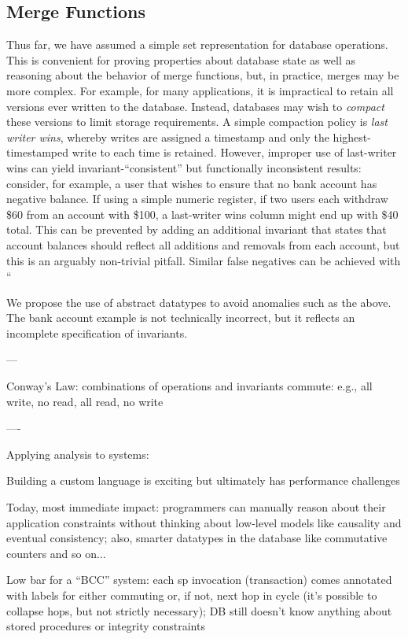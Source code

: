 \subsection{Merge Functions}

Thus far, we have assumed a simple set representation for database
operations. This is convenient for proving properties about database
state as well as reasoning about the behavior of merge functions, but,
in practice, merges may be more complex. For example, for many
applications, it is impractical to retain all versions ever written to
the database. Instead, databases may wish to \textit{compact} these
versions to limit storage requirements. A simple compaction policy is
\textit{last writer wins}, whereby writes are assigned a timestamp and
only the highest-timestamped write to each time is retained. However,
improper use of last-writer wins can yield invariant-``consistent''
but functionally inconsistent results: consider, for example, a user
that wishes to ensure that no bank account has negative balance. If
using a simple numeric register, if two users each withdraw \$60 from
an account with \$100, a last-writer wins column might end up with
\$40 total. This can be prevented by adding an additional invariant
that states that account balances should reflect all additions and
removals from each account, but this is an arguably non-trivial
pitfall. Similar false negatives can be achieved with ``

We propose the use of abstract datatypes to avoid anomalies such as
the above. The bank account example is not technically incorrect, but
it reflects an incomplete specification of invariants.

---

Conway's Law: combinations of operations and invariants commute: e.g., all write, no read, all read, no write

----

Applying analysis to systems:

Building a custom language is exciting but ultimately has performance challenges

Today, most immediate impact: programmers can manually reason about their application constraints without thinking about low-level models like causality and eventual consistency; also, smarter datatypes in the database like commutative counters and so on...

Low bar for a ``BCC'' system: each sp invocation (transaction) comes annotated with labels for either commuting or, if not, next hop in cycle (it's possible to collapse hops, but not strictly necessary); DB still doesn't know anything about stored procedures or integrity constraints

